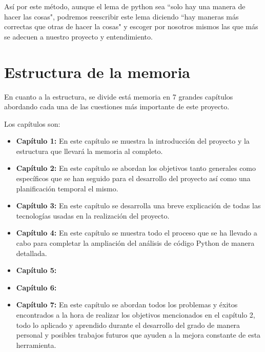 \documentclass[a4paper, 12pt]{book}
\begin{document}
Así por este método, aunque el lema de python sea ``solo hay una manera de hacer las cosas", podremos reescribir este lema diciendo ``hay maneras más correctas que otras de hacer la cosas" y escoger por nosotros mismos las que más se adecuen a nuestro proyecto y entendimiento.

\section{Estructura de la memoria}
\label{sec:estructura}

En cuanto a la estructura, se divide está memoria en 7 grandes capítulos abordando cada una de las cuestiones más importante de este proyecto.

Los capítulos son:

\begin{itemize}
  \item \textbf{Capítulo 1:} En este capítulo se muestra la introducción del proyecto y la estructura que llevará la memoria al completo.
  
  \item \textbf{Capítulo 2:} En este capítulo se abordan los objetivos tanto generales como específicos que se han seguido para el desarrollo del proyecto así como una planificación temporal el mismo.
  
  \item \textbf{Capítulo 3:} En este capítulo se desarrolla una breve explicación de todas las tecnologías usadas en la realización del proyecto.
  
  \item \textbf{Capítulo 4:} En este capítulo se muestra todo el proceso que se ha llevado a cabo para completar la ampliación del análisis de código Python de manera detallada.
  
  \item \textbf{Capítulo 5:}
  
  \item \textbf{Capítulo 6:}
  
  \item \textbf{Capítulo 7:} En este capítulo se abordan todos los problemas y éxitos encontrados a la hora de realizar los objetivos mencionados en el capítulo 2, todo lo aplicado y aprendido durante el desarrollo del grado de manera personal y posibles trabajos futuros que ayuden a la mejora constante de esta herramienta.
\end{itemize}
\end{document}
